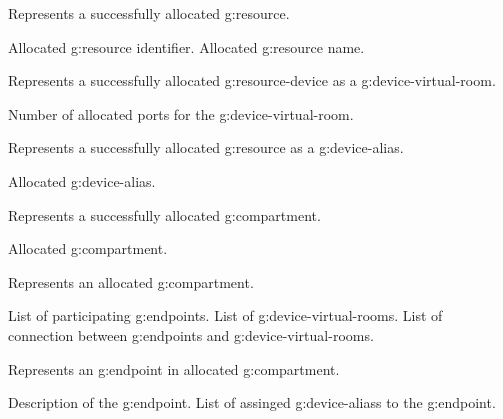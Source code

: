 \begin{Api}
Represents a successfully allocated \gls{g:resource}.
\begin{ApiClassAttributes}
 Allocated \gls{g:resource} identifier.
 Allocated \gls{g:resource} name. 
\end{ApiClassAttributes}

Represents a successfully allocated \gls{g:resource-device} as a \gls{g:device-virtual-room}.
\begin{ApiClassAttributes}
 Number of allocated ports for the \gls{g:device-virtual-room}.
\end{ApiClassAttributes}

Represents a successfully allocated \gls{g:resource} as a \gls{g:device-alias}.
\begin{ApiClassAttributes}
 Allocated \gls{g:device-alias}.
\end{ApiClassAttributes}

Represents a successfully allocated \gls{g:compartment}.
\begin{ApiClassAttributes}
 Allocated \gls{g:compartment}.
\end{ApiClassAttributes}

Represents an allocated \gls{g:compartment}.
\begin{ApiClassAttributes}
 List of participating \glspl{g:endpoint}.
 List of \glspl{g:device-virtual-room}.
 List of connection between \glspl{g:endpoint} and \glspl{g:device-virtual-room}.
\end{ApiClassAttributes}

Represents an \gls{g:endpoint} in allocated \gls{g:compartment}.
\begin{ApiClassAttributes}
 Description of the \gls{g:endpoint}.
 List of assinged \glspl{g:device-alias} to the \gls{g:endpoint}.
\end{ApiClassAttributes}


\end{Api}
